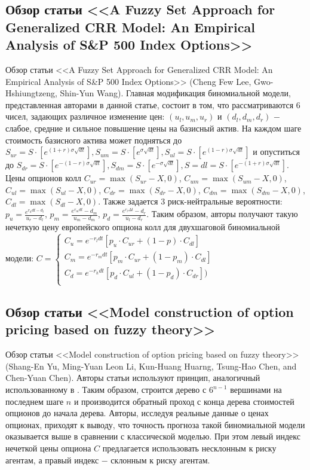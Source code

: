 \documentclass[a4paper,12pt]{extarticle} %
\begin{document}
	\subsection{Обзор статьи <<A Fuzzy Set Approach for Generalized CRR Model: An Empirical Analysis of S\&P 500 Index Options>>}
	Обзор статьи <<A Fuzzy Set Approach for Generalized CRR Model: An Empirical Analysis of S\&P 500 Index Options>> \cite{3} (Cheng Few Lee, Gwo-Hshiungtzeng, Shin-Yun Wang). Главная модификация биномиальной модели, представленная авторами в данной статье, состоит в том, что рассматриваются 6 чисел, задающих различное изменение цен: $(u_l, u_m, u_r)$ и $(d_l, d_m, d_r)$ $-$ слабое, средние и сильное повышение цены на базисный актив. На каждом шаге стоимость базисного актива может подняться до $S_{ur}=S\cdot[e^{(1+r)\sigma \sqrt{dt}}],S_{um}=S\cdot[e^{\sigma \sqrt{dt}}],S_{ul}=S\cdot[e^{(1-r)\sigma \sqrt{dt}}]$ и опуститься до $S_{dr}=S\cdot[e^{-(1-r)\sigma \sqrt{dt}}],S_{dm}=S\cdot[e^{-\sigma \sqrt{dt}}],S={dl}=S\cdot[e^{-(1+r)\sigma \sqrt{dt}}]$. Цены опционов колл $C_{ur} = \max(S_{ur} - X,0)$, $C_{um} = \max(S_{um} - X,0)$, $C_{ul} =
	\max(S_{ul} - X,0)$, $C_{dr} = \max(S_{dr} - X,0)$, $C_{dm} = \max(S_{dm} - X,0)$, $C_{dl} = \max(S_{dl} - X,0)$. Также задается $3$ риск-нейтральные вероятности: $p_{u}=\frac{e^{r_h dt - d_l}}{u_r-d_l}$, $p_m=\frac{e^{r_m dt}-d_m}{u_m-d_m}$, $p_d=\frac{e^{r_l\Delta t}-d_r}{u_l-d_r}$. Таким образом, авторы получают такую нечеткую цену европейского опциона колл для двухшаговой биномиальной модели: $C=\begin{cases} C_u=e^{-r_l dt}[p_u\cdot C_{ur}+(1-p)\cdot C_{dl}] \\ C_m=e^{-r_m dt}[p_m\cdot C_{ur}+(1-p_m)\cdot C_{dl}] \\ C_d=e^{-r_h dt}[p_d\cdot C_{ul} + (1-p_d)\cdot C_{dr}]) \\ \end{cases}$
	
	\subsection{Обзор статьи <<Model construction of option pricing based on fuzzy theory>>}
	Обзор статьи <<Model construction of option pricing based on fuzzy theory>> \cite{2} (Shang-En Yu, Ming-Yuan Leon Li, Kun-Huang Huarng, Tsung-Hao Chen, and Chen-Yuan Chen). Авторы статьи используют принцип, аналогичный использованному в \cite{3}. Таким образом, строится дерево с $6^{n-1}$ вершинами на последнем шаге $n$ и производится обратный проход с конца дерева стоимостей опционов до начала дерева. Авторы, исследуя реальные данные о ценах опционах, приходят к выводу, что точность прогноза такой биномиальной модели оказывается выше в сравнении с классической моделью. При этом левый индекс нечеткой цены опциона $C$ предлагается использовать несклонным к риску агентам, а правый индекс $-$ склонным к риску агентам.
	
\end{document}
